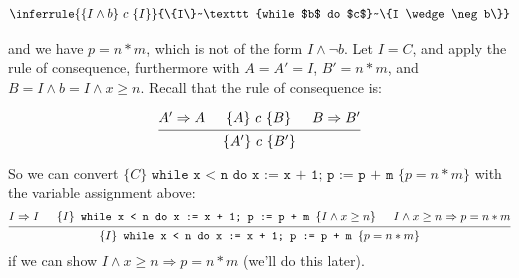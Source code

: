 \documentclass[11pt]{article}
\begin{document}
\[
    \inferrule{\{I \wedge b\}~c~\{I\} }{\{I\}~\texttt{while $b$ do $c$}~\{I \wedge \neg b\}}
\]

and we have $p = n * m$, which is not of the form $I \wedge \neg b$. Let $I = C$, and apply the rule of consequence, furthermore with $A = A' = I$, $B' = n * m$, and $B = I \wedge b = I \wedge x \geq n$.  Recall that the rule of consequence is:

\[
\begin{prooftree}
  \hypo{A' \Rightarrow A}
  \hypo{\{A \} ~c~ \{ B\} }
  \hypo{B \Rightarrow B'}
  \infer3{\{A'\} ~c~\{B' \}}
\end{prooftree}
\]

So we can convert $\{ C \} \texttt{~while x < n do x := x + 1; p := p + m~} \{ p = n * m \}$ with the variable assignment above:
\[
\begin{prooftree}
  \hypo{I \Rightarrow I}
  \hypo{\{I \} \texttt{~while x < n do x := x + 1; p := p + m~} \{ I \wedge x \geq n \} }
  \hypo{I \wedge x \geq n \Rightarrow p = n * m }
  \infer3{\{I \} \texttt{~while x < n do x := x + 1; p := p + m~}\{ p = n * m \}}
\end{prooftree}
\]
if we can show $I \wedge x \geq n \Rightarrow p = n * m$ (we'll do this later).
\end{document}
